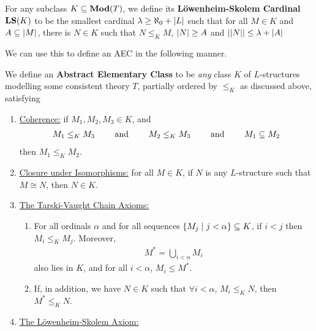 \begin{boxdefinition}
    For any subclass $K \subseteq \mathbf{Mod}(T)$, we define its \textbf{Löwenheim-Skolem Cardinal $\mathbf{LS}(K)$} to be the smallest cardinal $\lambda \geq \aleph_0 + \left\lvert L \right\rvert$ such that for all $M \in K$ and $A \subseteq \left\lvert M \right\rvert$, there is $N \in K$ such that $N \leq_K M$, $\left\lvert N \right\rvert \geq A$ and $\left\lvert \left\lvert N \right\rvert \right\rvert \leq \lambda + \left\lvert A \right\rvert$
\end{boxdefinition}

We can use this to define an AEC in the following manner.

\begin{boxdefinition}
    We define an \textbf{Abstract Elementary Class} to be \textit{any} class $K$ of $L$-structures modelling some consistent theory $T$, partially ordered by $\leq_K$ as discussed above, satisfying
    \begin{enumerate}
        \item \underline{Coherence:} if $M_1, M_2, M_3 \in K$, and
        \begin{align*}
            M_1 \leq_K M_3
            \qquad \text{ and } \qquad
            M_2 \leq_K M_3
            \qquad \text{ and } \qquad
            M_1 \subseteq M_2
        \end{align*}
        then $M_1 \leq_K M_2$.

        \item \underline{Closure under Isomorphisms:} for all $M \in K$, if $N$ is any $L$-structure such that $M \cong N$, then $N \in K$.

        \item \underline{The Tarski-Vaught Chain Axioms:}
        \begin{enumerate}
            \item For all ordinals $\alpha$ and for all sequences $\left\{ M_j \; \middle\vert \; j < \alpha \right\} \subseteq K$, if $i < j$ then $M_i \leq_K M_j$. Moreover,
            \begin{align*}
                M^{*} = \bigcup_{i < \alpha} M_i
            \end{align*}
            also lies in $K$, and for all $i < \alpha$, $M_i \leq M^*$.

            \item If, in addition, we have $N \in K$ such that $\forall i < \alpha$, $M_i \leq_K N$, then $M^* \leq_K N$.
        \end{enumerate}

        \item \underline{The Löwenheim-Skolem Axiom:} \sorry %
    \end{enumerate}
\end{boxdefinition}

